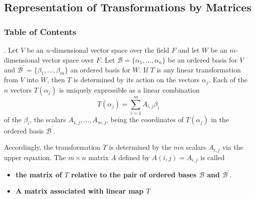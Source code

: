 \documentclass[8pt]{beamer}
\newcommand{\mc}[1]{\mathcal{#1}}
\newcommand{\tb}[1]{\textbf{#1}}
\begin{document}
\subsection{Representation of Transformations by Matrices}

\begingroup
    \begin{frame}
        \frametitle{Table of Contents}
        \tableofcontents[currentsubsection]
    \end{frame}
\endgroup

\begin{frame}{.}
    Let $V$ be an $n$-dimensional vector space over the field $F$ and let $W$ be an $m$-dimensional vector space over $F$.
    Let $\mc{B} = \{\alpha_1, \dots, \alpha_n\}$ be an ordered basis for $V$ and $\mc{B}^\prime = \{\beta_1, \dots, \beta_m\}$ an ordered basis for $W$.
    If $T$ is any linear transformation from $V$ into $W$, then $T$ is determined by its action on the vectors $\alpha_j$.
    Each of the $n$ vectors $T(\alpha_j)$ is uniquely expressible as a linear combination
    \[
        T(\alpha_j) = \sum_{i=1}^m A_{i,j} \beta_i
    \]
    of the $\beta_i$, the scalars $A_{1,j}, \dots, A_{m,j}$, being the coordinates of $T(\alpha_j)$ in the ordered basis $\mc{B}^\prime$.

    Accordingly, the transformation $T$ is determined by the $mn$ scalars $A_{i,j}$ via the upper equation.
    The $m \times n$ matrix $A$ defined by $A(i,j) = A_{i,j}$ is called 
    \begin{itemize}
        \item \tb{the matrix of $T$ relative to the pair of ordered bases $\mc{B}$ and $\mc{B}^\prime$}.
        \item \tb{A matrix associated with linear map $T$}
    \end{itemize}
\end{frame}
\end{document}
